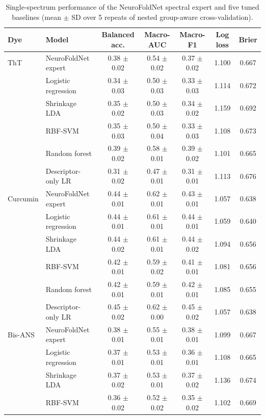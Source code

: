 \begin{table}[!htbp]
\centering\scriptsize
\caption{Single-spectrum performance of the NeuroFoldNet spectral expert and five tuned baselines (mean $\pm$ SD over 5 repeats of nested group-aware cross-validation).}\label{tab:s_spectra_models}
\begin{tabular}{llccccc}
\toprule
\textbf{Dye} & \textbf{Model} & \textbf{Balanced acc.} & \textbf{Macro-AUC} & \textbf{Macro-F1} & \textbf{Log loss} & \textbf{Brier} \\
\midrule
ThT & NeuroFoldNet expert & 0.38 $\pm$ 0.02 & 0.54 $\pm$ 0.02 & 0.37 $\pm$ 0.02 & 1.100 & 0.667 \\
 & Logistic regression & 0.34 $\pm$ 0.03 & 0.50 $\pm$ 0.03 & 0.33 $\pm$ 0.03 & 1.114 & 0.672 \\
 & Shrinkage LDA & 0.35 $\pm$ 0.02 & 0.50 $\pm$ 0.03 & 0.34 $\pm$ 0.02 & 1.159 & 0.692 \\
 & RBF-SVM & 0.35 $\pm$ 0.03 & 0.50 $\pm$ 0.04 & 0.33 $\pm$ 0.03 & 1.108 & 0.673 \\
 & Random forest & 0.39 $\pm$ 0.02 & 0.58 $\pm$ 0.01 & 0.39 $\pm$ 0.02 & 1.101 & 0.665 \\
 & Descriptor-only LR & 0.31 $\pm$ 0.02 & 0.47 $\pm$ 0.01 & 0.31 $\pm$ 0.01 & 1.113 & 0.676 \\
Curcumin & NeuroFoldNet expert & 0.44 $\pm$ 0.01 & 0.62 $\pm$ 0.01 & 0.43 $\pm$ 0.01 & 1.057 & 0.638 \\
 & Logistic regression & 0.44 $\pm$ 0.01 & 0.61 $\pm$ 0.01 & 0.44 $\pm$ 0.01 & 1.059 & 0.640 \\
 & Shrinkage LDA & 0.44 $\pm$ 0.02 & 0.61 $\pm$ 0.01 & 0.44 $\pm$ 0.02 & 1.094 & 0.656 \\
 & RBF-SVM & 0.42 $\pm$ 0.01 & 0.59 $\pm$ 0.02 & 0.41 $\pm$ 0.01 & 1.081 & 0.656 \\
 & Random forest & 0.42 $\pm$ 0.01 & 0.59 $\pm$ 0.01 & 0.42 $\pm$ 0.01 & 1.085 & 0.655 \\
 & Descriptor-only LR & 0.45 $\pm$ 0.02 & 0.62 $\pm$ 0.00 & 0.45 $\pm$ 0.02 & 1.057 & 0.638 \\
Bis-ANS & NeuroFoldNet expert & 0.38 $\pm$ 0.01 & 0.55 $\pm$ 0.01 & 0.38 $\pm$ 0.01 & 1.099 & 0.667 \\
 & Logistic regression & 0.37 $\pm$ 0.01 & 0.53 $\pm$ 0.01 & 0.36 $\pm$ 0.01 & 1.108 & 0.665 \\
 & Shrinkage LDA & 0.37 $\pm$ 0.02 & 0.53 $\pm$ 0.01 & 0.37 $\pm$ 0.02 & 1.136 & 0.674 \\
 & RBF-SVM & 0.36 $\pm$ 0.02 & 0.52 $\pm$ 0.02 & 0.35 $\pm$ 0.02 & 1.102 & 0.669 \\

\end{tabular}
\end{table}
